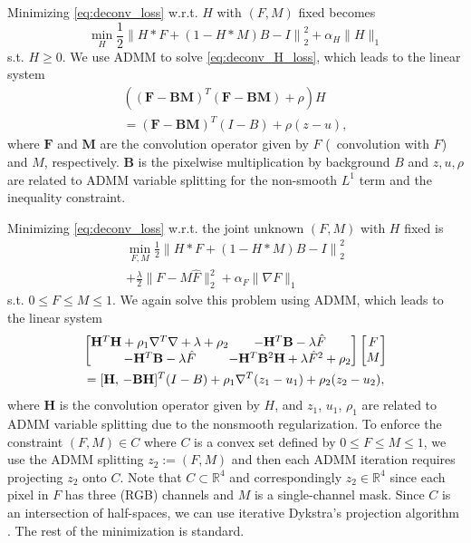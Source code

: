 \documentclass[10pt,twocolumn,letterpaper]{article}
\begin{document}
Minimizing \eqref{eq:deconv_loss} w.r.t. $H$ with $(F,M)$ fixed becomes
\begin{equation}
	\label{eq:deconv_H_loss}
	\min_H\frac{1}{2}\left\|H*F+(1-H*M)B-I\right\|_2^2+\alpha_H\|H\|_1
\end{equation}
s.t. $H \geq 0$. We use ADMM to solve \eqref{eq:deconv_H_loss}, which leads to the linear system
\begin{multline}
	\label{eq:deconv_H_eq}
	\left((\mathbf{F}-\mathbf{B}\mathbf{M})^T(\mathbf{F}-\mathbf{B}\mathbf{M})+\rho\right)H \\
	=(\mathbf{F}-\mathbf{B}\mathbf{M})^T(I-B)+\rho(z-u),
\end{multline}
where $\mathbf{F}$ and $\mathbf{M}$ are the convolution operator given by $F$ (\ie~convolution with $F$) and $M$, respectively. $\mathbf{B}$ is the pixelwise multiplication by background $B$ and $z,u,\rho$ are related to ADMM variable splitting for the non-smooth $L^1$ term and the inequality constraint.

Minimizing \eqref{eq:deconv_loss} w.r.t. the joint unknown $(F,M)$ with $H$ fixed is
\begin{multline}
	\label{eq:deconv_F_loss}
	\min_{F,M}\frac{1}{2}\left\|H*F+(1-H*M)B-I\right\|_2^2\\
	+\frac{\lambda}{2}\|F-M\hat F\|_2^2	+\alpha_F\|\nabla F\|_1
\end{multline}
s.t. $0\leq F\leq M\leq 1$.
We again solve this problem using ADMM, which leads to the linear system
\begin{equation}
	\label{eq:deconv_F_eq}
	\begin{gathered}
	\begin{bmatrix} \mathbf{H}^T\mathbf{H}+\rho_1\nabla^T\nabla+\lambda+\rho_2 & \hspace{-1em}-\mathbf{H}^T\mathbf{B}-\lambda\hat F \\ -\mathbf{H}^T\mathbf{B}-\lambda\hat F & \hspace{-1em}-\mathbf{H}^T\mathbf{B}^2\mathbf{H}+\lambda\hat F^2 + \rho_2 \end{bmatrix} \begin{bmatrix} F \\ M \end{bmatrix} \\
	= [\mathbf{H},\, -\mathbf{BH} ]^T (I-B)	+ \rho_1 \nabla^T (z_1-u_1) + \rho_2(z_2-u_2),\end{gathered}
\end{equation}
where $\mathbf{H}$ is the convolution operator given by $H$, and $z_1$, $u_1$, $\rho_1$ are related to ADMM variable splitting due to the nonsmooth regularization. To enforce the constraint $(F,M)\in C$ where $C$ is a convex set defined by $0\leq F\leq M\leq 1$, we use the ADMM splitting $z_2:=(F,M)$ and then each ADMM iteration requires projecting $z_2$ onto $C$. Note that $C\subset\mathbb{R}^4$ and correspondingly $z_2\in\mathbb{R}^4$ since each pixel in $F$ has three (RGB) channels and $M$ is a single-channel mask. Since $C$ is an intersection of half-spaces, we can use iterative Dykstra's projection algorithm \cite{dykstra}. The rest of the minimization is standard.
\end{document}
